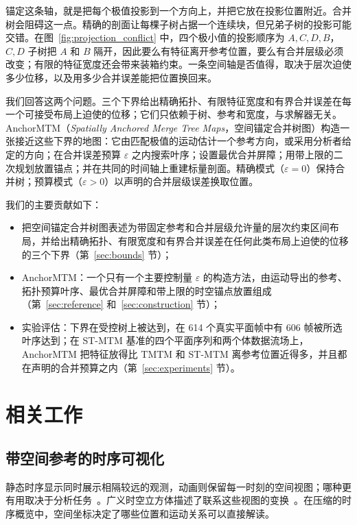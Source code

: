 \documentclass[fontset=none,zihao=5,a4paper]{ctexart}
\begin{document}
锚定这条轴，就是把每个极值投影到一个方向上，并把它放在投影位置附近。合并树会阻碍这一点。精确的剖面让每棵子树占据一个连续块，但兄弟子树的投影可能交错。在图~\ref{fig:projection_conflict} 中，四个极小值的投影顺序为 $A,C,D,B$，$C,D$ 子树把 $A$ 和 $B$ 隔开，因此要么有特征离开参考位置，要么有合并层级必须改变；有限的特征宽度还会带来装箱约束。一条空间轴是否值得，取决于层次迫使多少位移，以及用多少合并误差能把位置换回来。

我们回答这两个问题。三个下界给出精确拓扑、有限特征宽度和有界合并误差在每一个可接受布局上迫使的位移；它们只依赖于树、参考和宽度，与求解器无关。AnchorMTM（\emph{Spatially Anchored Merge Tree Maps}，空间锚定合并树图）构造一张接近这些下界的地图：它由匹配极值的运动估计一个参考方向，或采用分析者给定的方向；在合并误差预算 $\varepsilon$ 之内搜索叶序；设置最优合并屏障；用带上限的二次规划放置锚点；并在共同的时间轴上重建标量剖面。精确模式（$\varepsilon=0$）保持合并树；预算模式（$\varepsilon>0$）以声明的合并层级误差换取位置。

我们的主要贡献如下：
\begin{itemize}
\item 把空间锚定合并树图表述为带固定参考和合并层级允许量的层次约束区间布局，并给出精确拓扑、有限宽度和有界合并误差在任何此类布局上迫使的位移的三个下界（第~\ref{sec:bounds} 节）；
\item AnchorMTM：一个只有一个主要控制量 $\varepsilon$ 的构造方法，由运动导出的参考、拓扑预算叶序、最优合并屏障和带上限的时空锚点放置组成（第~\ref{sec:reference} 和~\ref{sec:construction} 节）；
\item 实验评估：下界在受控树上被达到，在 614 个真实平面帧中有 606 帧被所选叶序达到；在 ST-MTM 基准的四个平面序列和两个体数据流场上，AnchorMTM 把特征放得比 TMTM 和 ST-MTM 离参考位置近得多，并且都在声明的合并预算之内（第~\ref{sec:experiments} 节）。
\end{itemize}

\section{相关工作}\label{sec:related}
\subsection{带空间参考的时序可视化}
静态时序显示同时展示相隔较远的观测，动画则保留每一时刻的空间视图；哪种更有用取决于分析任务~\cite{Tversky:2002:Animation,Robertson:2008:Animation}。广义时空立方体描述了联系这些视图的变换~\cite{Bach:2017:STC}。在压缩的时序概览中，空间坐标决定了哪些位置和运动关系可以直接解读。
\end{document}
